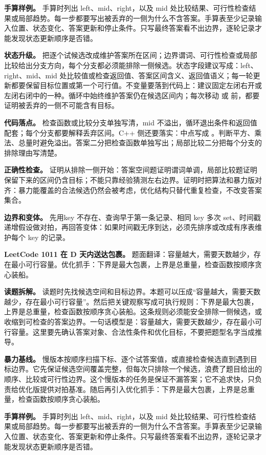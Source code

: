 \textbf{手算样例。} 手算时列出 left、mid、right，以及 mid 处比较结果、可行性检查结果或局部趋势。每一步都要写出被丢弃的一侧为什么不含答案。手算表至少记录输入位置、状态变化、答案更新和停止条件。只写最终答案看不出边界，逐轮记录才能发现状态更新顺序是否错。

\textbf{状态升级。} 把逐个试候选改成维护答案所在区间；边界谓词、可行性检查或局部比较给出分支方向，每个分支都必须能排除一侧候选。状态字段建议写成：left、right、mid、mid 处比较值或检查返回值、答案区间含义、返回值语义；每一轮更新都要保留目标位置或第一个可行值。不变量要落到代码上：建议固定左闭右开或左闭右闭中的一种。循环中始终维护答案仍在候选区间内；每次移动  或  前，都要证明被丢弃的一侧不可能含有目标。

\textbf{代码落点。} 检查函数或比较分支单独写清，mid 不溢出，循环退出条件和返回值配套；每个分支都要解释丢弃区间。C++ 侧还要落实：中点写成 。判断平方、乘法、总量时避免溢出。答案二分把检查函数单独写出；局部比较二分把每个分支的排除理由写清楚。

\textbf{正确性检查。} 证明从排除一侧开始：答案空间题证明谓词单调，局部比较题证明保留下来的区间仍含目标；不能只靠经验猜测左右边界。证明时把算法和暴力版对齐：暴力能覆盖的合法候选仍然会被考虑，优化结构只替代重复检查，不改变答案集合。

\textbf{边界和变体。} 先用key 不存在、查询早于第一条记录、相同 key 多次 set、时间戳递增假设做对拍，再回答变体：如果时间戳无序到达，必须先排序或改成有序表维护每个 key 的记录。

\noindent\textbf{LeetCode 1011 在 D 天内送达包裹。} 题面翻译：容量越大，需要天数越少，存在最小可行容量。优化抓手：下界是最大包裹，上界是总重量，检查函数按顺序贪心装船。

\textbf{读题拆解。} 读题时先找候选空间和目标边界。本题可以压成“容量越大，需要天数越少，存在最小可行容量”。然后把关键观察写成可执行规则：下界是最大包裹，上界是总重量，检查函数按顺序贪心装船。这条规则必须能安全排除一侧候选，或收缩到可检查的答案边界。一句话模型是：容量越大，需要天数越少，存在最小可行容量。这里要先确认答案对象、合法性条件和优化目标，不要把题型名字当成推导。

\textbf{暴力基线。} 慢版本按顺序扫描下标、逐个试答案值，或直接检查候选直到遇到目标边界。它先保证候选空间覆盖完整，但每次只排除一个候选，浪费了题目给出的顺序、比较或可行性边界。这个慢版本的任务是保证不漏答案；它不追求快，只负责给优化版提供对拍基准。随后再引入优化抓手：下界是最大包裹，上界是总重量，检查函数按顺序贪心装船。

\textbf{手算样例。} 手算时列出 left、mid、right，以及 mid 处比较结果、可行性检查结果或局部趋势。每一步都要写出被丢弃的一侧为什么不含答案。手算表至少记录输入位置、状态变化、答案更新和停止条件。只写最终答案看不出边界，逐轮记录才能发现状态更新顺序是否错。

